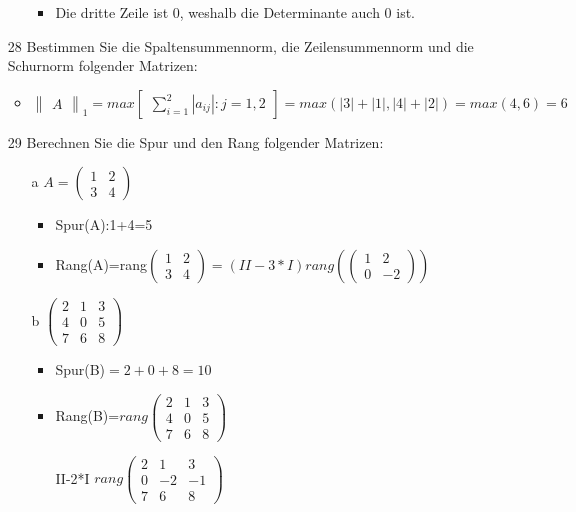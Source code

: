 \documentclass{article}
\begin{document}
\begin{itemize}
\begin{itemize}
			\begin{itemize}
				\item{Die dritte Zeile ist 0, weshalb die Determinante auch 0 ist.}
			\end{itemize}
		\end{itemize}
		\item[28]{Bestimmen Sie die Spaltensummennorm, die Zeilensummennorm und die Schurnorm folgender Matrizen:}
		\begin{itemize}
			\item{$\begin{Vmatrix} A \end{Vmatrix}_1=max\begin{bmatrix}\sum_{i=1}^{2}|a_{ij}|:j=1,2\end{bmatrix}=max(|3|+|1|, |4|+|2|)=max(4,6)=6$}
		\end{itemize}
		\item[29]{Berechnen Sie die Spur und den Rang folgender Matrizen:}
		\begin{itemize}
			\item[a]{$A=\begin{pmatrix} 1 & 2 \\ 3 & 4 \end{pmatrix}$}
			\begin{itemize}
				\item{Spur(A):1+4=5}
				\item{Rang(A)=rang$\begin{pmatrix} 1 & 2 \\ 3 & 4\end{pmatrix}=(II-3*I)rang(\begin{pmatrix} 1 & 2 \\ 0 & -2 \end{pmatrix})$}
			\end{itemize}
			\item[b]{$\begin{pmatrix} 2 & 1 & 3 \\ 4 & 0 & 5 \\ 7 & 6 & 8 \end{pmatrix}$}
			\begin{itemize}
				\item{Spur(B)$=2+0+8=10$}
				\item{Rang(B)=$rang \begin{pmatrix} 2 & 1 & 3 \\ 4 & 0 & 5 \\ 7 & 6 & 8 \end{pmatrix}$}
				\item[II-2*I]{$rang \begin{pmatrix} 2 & 1 & 3 \\ 0 & -2 & -1 \\ 7 & 6 & 8 \end{pmatrix}$}

\end{itemize}
\end{itemize}
\end{itemize}
\end{document}
